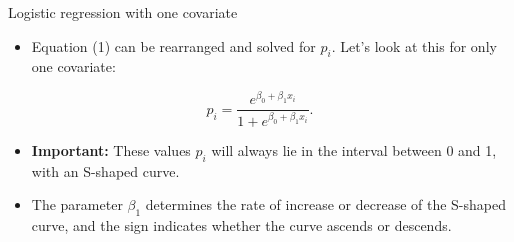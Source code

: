 \documentclass[10pt,ignorenonframetext,]{beamer}
\providecommand{\tightlist}{%
  \setlength{\itemsep}{0pt}\setlength{\parskip}{0pt}}
\begin{document}
\begin{frame}

\begin{block}{Logistic regression with one covariate}

\begin{itemize}
\tightlist
\item
  Equation (1) can be rearranged and solved for \(p_i\). Let's look at
  this for only one covariate:
\end{itemize}

\[ p_i= \frac{e^{\beta_0+\beta_1 x_i}}{1 + e^{\beta_0 + \beta_1 x_i}}.\]

\begin{itemize}
\item
  \textbf{Important:} These values \(p_i\) will always lie in the
  interval between 0 and 1, with an S-shaped curve.
\item
  The parameter \(\beta_1\) determines the rate of increase or decrease
  of the S-shaped curve, and the sign indicates whether the curve
  ascends or descends.
\end{itemize}

\end{block}

\end{frame}
\end{document}

